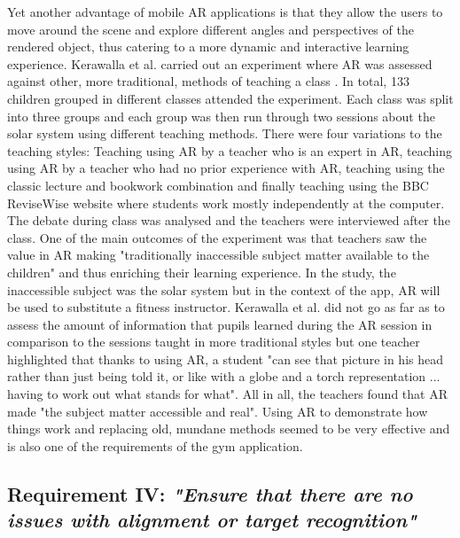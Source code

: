 \documentclass{l4proj}
\begin{document}
Yet another advantage of mobile AR applications is that they allow the users to move around the scene and explore different angles and perspectives of the rendered object, thus catering to a more dynamic and interactive learning experience\cite{fitzgerald_augmented_2013}\cite{dede_immersive_2009}. Kerawalla et al. carried out an experiment where AR was assessed against other, more traditional, methods of teaching a class \cite{kerawalla_making_2006}. In total, 133 children grouped in different classes attended the experiment. Each class was split into three groups and each group was then run through two sessions about the solar system using different teaching methods. There were four variations to the teaching styles: Teaching using AR by a teacher who is an expert in AR, teaching using AR by a teacher who had no prior experience with AR, teaching using the classic lecture and bookwork combination and finally teaching using the BBC ReviseWise website where students work mostly independently at the computer. The debate during class was analysed and the teachers were interviewed after the class. One of the main outcomes of the experiment was that teachers saw the value in AR making "traditionally inaccessible subject matter available to the children"\cite{kerawalla_making_2006} and thus enriching their learning experience. In the study, the inaccessible subject was the solar system but in the context of the app, AR will be used to substitute a fitness instructor. Kerawalla et al. did not go as far as to assess the amount of information that pupils learned during the AR session in comparison to the sessions taught in more traditional styles but one teacher highlighted that thanks to using AR, a student "can see that picture in his head rather than just being told it, or like with a globe and a torch representation ... having to work out what stands for what"\cite{kerawalla_making_2006}. All in all, the teachers found that AR made "the subject  matter accessible and real". Using AR to demonstrate how things work and replacing old, mundane methods seemed to be very effective and is also one of the requirements of the gym application.  

\subsection{\textbf{Requirement IV:} \textit{"Ensure that there are no issues with alignment or target recognition"}}
\label{requirement_IV}
\end{document}
